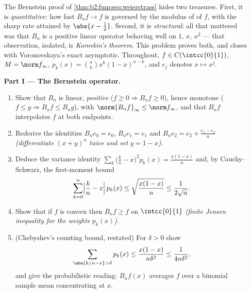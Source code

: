 \begin{problem}\label{pb:b2:funcseq:1}
The Bernstein proof of \cref{thm:b2:funcseq:weierstrass} hides
two treasures. First, it is \emph{quantitative}: how fast $B_nf
\to f$ is governed by the modulus of  of $f$, with the
sharp rate attained by $\abs{x - \frac12}$. Second, it is
\emph{structural}: all that mattered was that $B_n$ is a
positive linear operator behaving well on $1$, $x$, $x^2$ ---
that observation, isolated, is \emph{Korovkin's
theorem}. This problem proves both,
and closes with Voronovskaya's exact asymptotic. Throughout,
$f \in C(\intcc{0}{1})$, $M = \norm f_\infty$, $p_k(x) = \binom
nk x^k(1-x)^{n-k}$, and $e_j$ denotes $x \mapsto x^j$.

\medskip
\noindent\textbf{Part I --- The Bernstein operator.}
\begin{enumerate}
  \item Show that $B_n$ is linear, \emph{positive} ($f \geq 0
        \Rightarrow B_nf \geq 0$), hence monotone ($f \leq g
        \Rightarrow B_nf \leq B_ng$), with
        $\norm{B_nf}_\infty \leq \norm f_\infty$, and that
        $B_nf$ interpolates $f$ at both endpoints.
  \item Rederive the identities $B_n e_0 = e_0$, $B_n e_1 =
        e_1$ and $B_n e_2 = e_2 + \frac{e_1 - e_2}{n}$
        \emph{(differentiate $(x + y)^n$ twice and set $y = 1 -
        x$)}.
  \item Deduce the variance identity $\sum_k \bigl(\frac kn -
        x\bigr)^2 p_k(x) = \frac{x(1-x)}{n}$ and, by
        Cauchy--Schwarz, the first-moment bound
        \[
        \sum_{k=0}^{n}\Bigl|\frac kn - x\Bigr|\,p_k(x)
        \leq \sqrt{\frac{x(1-x)}{n}} \leq \frac{1}{2\sqrt n} .
        \]
  \item Show that if $f$ is convex then $B_nf \geq f$ on
        $\intcc{0}{1}$ \emph{(finite Jensen inequality for the
        weights $p_k(x)$)}.
  \item (Chebyshev's counting bound, restated) For $\delta > 0$
        show
        \[
        \sum_{\abs{k/n - x} > \delta} p_k(x)
        \leq \frac{x(1-x)}{n\delta^2}
        \leq \frac{1}{4n\delta^2} ,
        \]
        and give the probabilistic reading: $B_nf(x)$ averages
        $f$ over a binomial sample mean concentrating at $x$.
\end{enumerate}


\end{problem}
